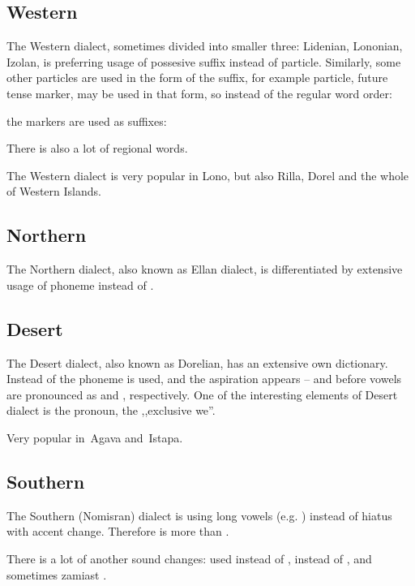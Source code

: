 \subsection{Western}
The Western dialect, sometimes divided into smaller three: Lidenian, Lononian,
Izolan, is preferring usage of possesive suffix  instead of
 particle. Similarly, some other particles are used in the form of
the suffix, for example  particle, future tense marker, may be used
in that form, so instead of the regular word order:


the markers are used as suffixes:


There is also a lot of regional words.

The Western dialect is very popular in Lono, but also Rilla, Dorel and the whole
of Western Islands.

\subsection{Northern}

The Northern dialect, also known as Ellan dialect, is differentiated by
extensive usage of  phoneme instead of .

\subsection{Desert}

The Desert dialect, also known as Dorelian, has an extensive own dictionary.
Instead of  the  phoneme is used, and the aspiration appears --
 and  before vowels are pronounced as  and ,
respectively. One of the interesting elements of Desert dialect is the
 pronoun, the ,,exclusive we''.

Very popular in~Agava and~Istapa.

\subsection{Southern}

The Southern (Nomisran) dialect is using long vowels (e.g. ) instead of
hiatus with accent change. Therefore  is more  than
.

There is a lot of another sound changes:  used instead of , 
instead of , and sometimes  zamiast .

